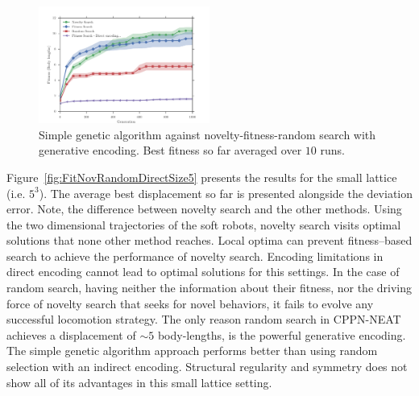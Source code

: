 \documentclass{sig-alternate}
\begin{document}
\begin{figure}[t!]
\centering
\includegraphics[width=0.5\textwidth]{../Figures/Results/FitvsNovVsDirSize10.pdf}
\caption{Simple genetic algorithm against novelty-fitness-random search with generative encoding. Best fitness so far averaged over $10$ runs.}
\label{fig:FitvsNovVsDirSize10}
\end{figure} 

Figure~\ref{fig:FitNovRandomDirectSize5} presents the results for the small lattice (i.e. $5^3$). The average best displacement so far is presented alongside the deviation error. Note, the difference between novelty search and the other methods. Using the two dimensional trajectories of the soft robots, novelty search visits optimal solutions that none other method reaches. Local optima can prevent fitness--based search to achieve the performance of novelty search. Encoding limitations in direct encoding cannot lead to optimal solutions for this settings. In the case of random search, having neither the information about their fitness, nor the driving force of novelty search that seeks for novel behaviors, it fails to evolve any successful locomotion strategy. The only reason random search in CPPN-NEAT achieves a displacement of $\sim 5$ body-lengths, is the powerful generative encoding. The simple genetic algorithm approach performs better than using random selection with an indirect encoding. Structural regularity and symmetry does not show all of its advantages in this small lattice setting.
\end{document}
